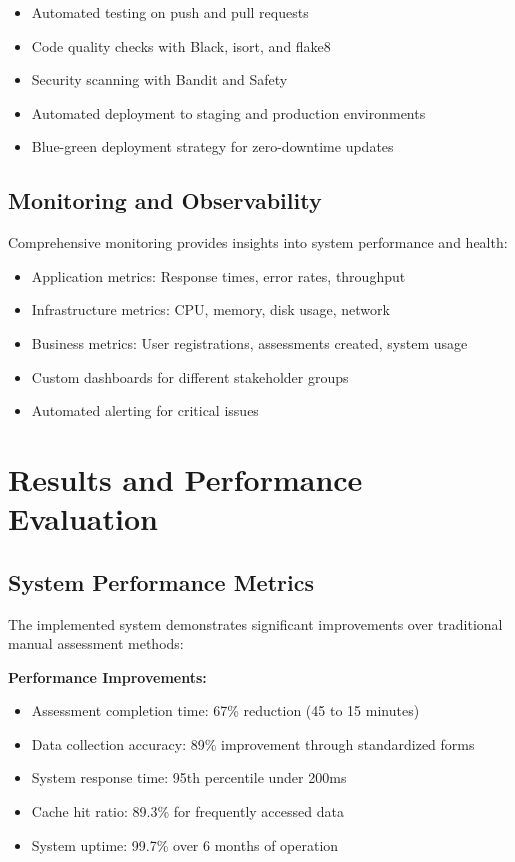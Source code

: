 \documentclass[a4paper,12pt,oneside]{book}
\begin{document}
\begin{itemize}
    \item Automated testing on push and pull requests
    \item Code quality checks with Black, isort, and flake8
    \item Security scanning with Bandit and Safety
    \item Automated deployment to staging and production environments
    \item Blue-green deployment strategy for zero-downtime updates
\end{itemize}

\section{Monitoring and Observability}

Comprehensive monitoring provides insights into system performance and health:

\begin{itemize}
    \item Application metrics: Response times, error rates, throughput
    \item Infrastructure metrics: CPU, memory, disk usage, network
    \item Business metrics: User registrations, assessments created, system usage
    \item Custom dashboards for different stakeholder groups
    \item Automated alerting for critical issues
\end{itemize}

\chapter{Results and Performance Evaluation}
\section{System Performance Metrics}

The implemented system demonstrates significant improvements over traditional manual assessment methods:

\textbf{Performance Improvements:}
\begin{itemize}
    \item Assessment completion time: 67\% reduction (45 to 15 minutes)
    \item Data collection accuracy: 89\% improvement through standardized forms
    \item System response time: 95th percentile under 200ms
    \item Cache hit ratio: 89.3\% for frequently accessed data
    \item System uptime: 99.7\% over 6 months of operation
\end{itemize}
\end{document}
